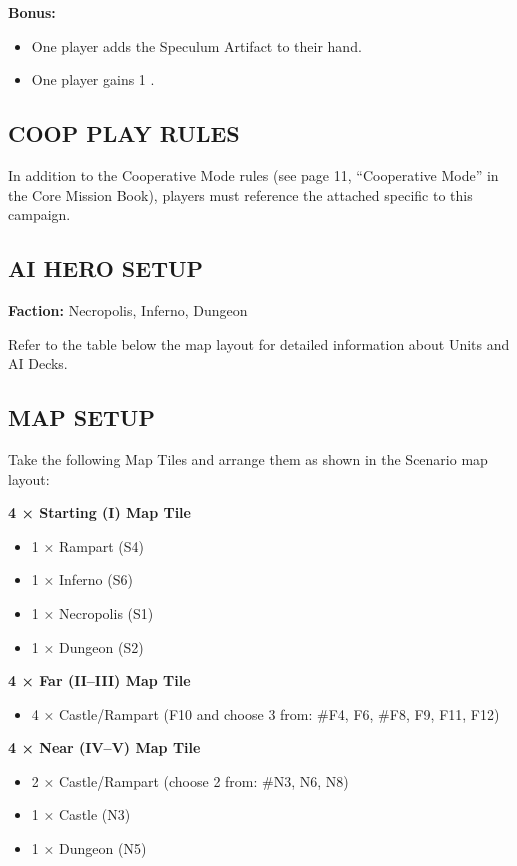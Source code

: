 \begin{multicols*}{2}
\columnbreak
\textbf{Bonus:}
\begin{itemize}
  \item One player adds the Speculum Artifact to their hand.
  \item One player gains 1 .
\end{itemize}

\subsection*{\MakeUppercase{Coop Play Rules}}

In addition to the Cooperative Mode rules (see page 11, ``Cooperative Mode'' in the Core Mission Book), players must reference the attached  specific to this campaign.

\subsection*{\MakeUppercase{AI Hero Setup}}

\textbf{Faction:} Necropolis, Inferno, Dungeon

Refer to the table below the map layout for detailed information about Units and AI Decks.

\subsection*{\MakeUppercase{Map Setup}}

Take the following Map Tiles and arrange them as shown in the Scenario map layout:

\textbf{4 × Starting (I) Map Tile}
\begin{itemize}
  \item 1 × Rampart (S4)
  \item 1 × Inferno (S6)
  \item 1 × Necropolis (S1)
  \item 1 × Dungeon (S2)
\end{itemize}

\textbf{4 × Far (II--III) Map Tile}
\begin{itemize}
  \item 4 × Castle/Rampart (F10 and choose 3 from: \#F4, F6, \#F8, F9, F11, F12)
\end{itemize}

\textbf{4 × Near (IV--V) Map Tile}
\begin{itemize}
  \item 2 × Castle/Rampart (choose 2 from: \#N3, N6, N8)
  \item 1 × Castle (N3)
  \item 1 × Dungeon (N5)
\end{itemize}


\end{multicols*}
